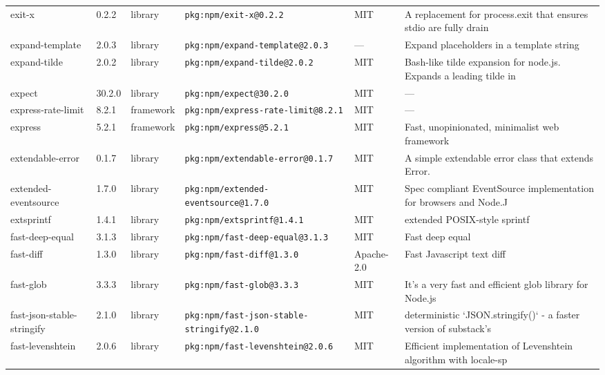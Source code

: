 \documentclass[11pt,a4paper]{article}
\begin{document}
\begin{longtable}{|p{4cm}|p{2cm}|p{1.6cm}|p{5cm}|p{1.5cm}|p{3.5cm}|}
\raggedright exit-x & 0.2.2 & library & \small\texttt{pkg:npm/exit-x@0.2.2} & MIT & \small A replacement for process.exit that ensures stdio are fully drain \\
\raggedright expand-template & 2.0.3 & library & \small\texttt{pkg:npm/expand-template@2.0.3} & — & \small Expand placeholders in a template string \\
\raggedright expand-tilde & 2.0.2 & library & \small\texttt{pkg:npm/expand-tilde@2.0.2} & MIT & \small Bash-like tilde expansion for node.js. Expands a leading tilde in \\
\raggedright expect & 30.2.0 & library & \small\texttt{pkg:npm/expect@30.2.0} & MIT & \small — \\
\raggedright express-rate-limit & 8.2.1 & framework & \small\texttt{pkg:npm/express-rate-limit@8.2.1} & MIT & \small — \\
\raggedright express & 5.2.1 & framework & \small\texttt{pkg:npm/express@5.2.1} & MIT & \small Fast, unopinionated, minimalist web framework \\
\raggedright extendable-error & 0.1.7 & library & \small\texttt{pkg:npm/extendable-error@0.1.7} & MIT & \small A simple extendable error class that extends Error. \\
\raggedright extended-eventsource & 1.7.0 & library & \small\texttt{pkg:npm/extended-eventsource@1.7.0} & MIT & \small Spec compliant EventSource implementation for browsers and Node.J \\
\raggedright extsprintf & 1.4.1 & library & \small\texttt{pkg:npm/extsprintf@1.4.1} & MIT & \small extended POSIX-style sprintf \\
\raggedright fast-deep-equal & 3.1.3 & library & \small\texttt{pkg:npm/fast-deep-equal@3.1.3} & MIT & \small Fast deep equal \\
\raggedright fast-diff & 1.3.0 & library & \small\texttt{pkg:npm/fast-diff@1.3.0} & Apache-2.0 & \small Fast Javascript text diff \\
\raggedright fast-glob & 3.3.3 & library & \small\texttt{pkg:npm/fast-glob@3.3.3} & MIT & \small It's a very fast and efficient glob library for Node.js \\
\raggedright fast-json-stable-stringify & 2.1.0 & library & \small\texttt{pkg:npm/fast-json-stable-stringify@2.1.0} & MIT & \small deterministic `JSON.stringify()` - a faster version of substack's \\
\raggedright fast-levenshtein & 2.0.6 & library & \small\texttt{pkg:npm/fast-levenshtein@2.0.6} & MIT & \small Efficient implementation of Levenshtein algorithm  with locale-sp \\

\end{longtable}
\end{document}
